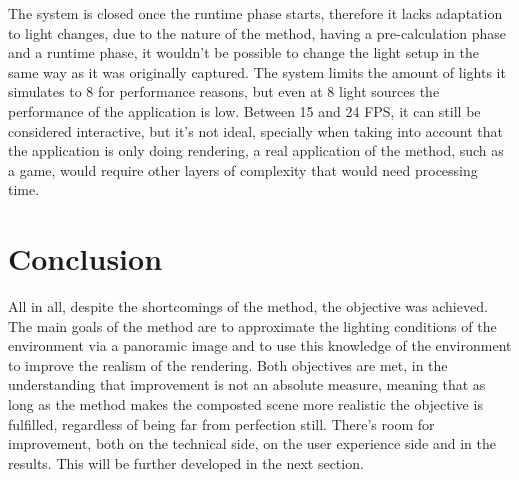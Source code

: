 The system is closed once the runtime phase starts, therefore it lacks adaptation to light changes, due to the nature of the method, having a pre-calculation phase and a runtime phase, it wouldn't be possible to change the light setup in the same way as it was originally captured.\newline
The system limits the amount of lights it simulates to 8 for performance reasons, but even at 8 light sources the performance of the application is low. Between 15 and 24 FPS, it can still be considered interactive, but it's not ideal, specially when taking into account that the application is only doing rendering, a real application of the method, such as a game, would require other layers of complexity that would need processing time.\newline


\section{Conclusion}
All in all, despite the shortcomings of the method, the objective was achieved. The main goals of the method are to approximate the lighting conditions of the environment via a panoramic image and to use this knowledge of the environment to improve the realism of the rendering. Both objectives are met, in the understanding that improvement is not an absolute measure, meaning that as long as the method makes the composted scene more realistic the objective is fulfilled, regardless of being far from perfection still.\newline
There's room for improvement, both on the technical side, on the user experience side and in the results. This will be further developed in the next section.

